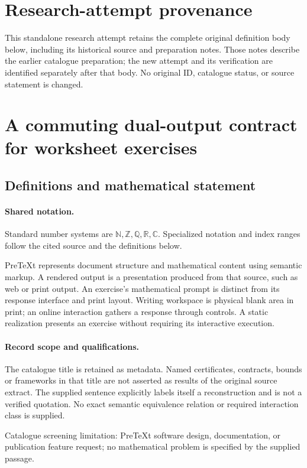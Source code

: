 \documentclass[11pt]{article}
\begin{document}
\section*{Research-attempt provenance}
This standalone research attempt retains the complete original definition body below,
including its historical source and preparation notes. Those notes describe the
earlier catalogue preparation; the new attempt and its verification are identified
separately after that body. No original ID, catalogue status, or source statement is changed.

\section{A commuting dual-output contract for worksheet exercises}\label{statement}

\subsection{Definitions and mathematical statement}

\paragraph{Shared notation.}Standard number systems are $\mathbb N,\mathbb Z,\mathbb Q,\mathbb R,\mathbb C$. Specialized notation and index ranges follow the cited source and the definitions below.


PreTeXt represents document structure and mathematical content using semantic markup. A rendered output is a presentation produced from that source, such as web or print output. An exercise's mathematical prompt is distinct from its response interface and print layout. Writing workspace is physical blank area in print; an online interaction gathers a response through controls. A static realization presents an exercise without requiring its interactive execution.
\paragraph{Record scope and qualifications.}
The catalogue title is retained as metadata. Named certificates, contracts, bounds or frameworks in that title are not asserted as results of the original source extract.
The supplied sentence explicitly labels itself a reconstruction and is not a verified quotation. No exact semantic equivalence relation or required interaction class is supplied.

Catalogue screening limitation: PreTeXt software design, documentation, or publication feature request; no mathematical problem is specified by the supplied passage.
\end{document}
